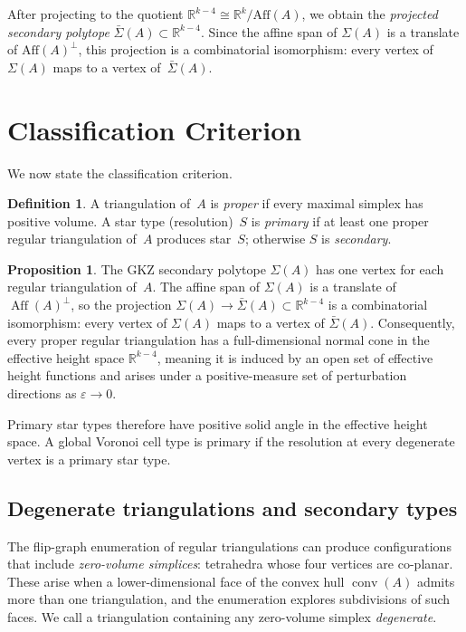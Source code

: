 \documentclass[11pt]{article}
\newcommand{\R}{\mathbb{R}}
\newcommand{\conv}{\operatorname{conv}}
\theoremstyle{definition}
\newtheorem{definition}{Definition}
\newtheorem{proposition}{Proposition}
\begin{document}
After projecting to the quotient $\R^{k-4} \cong \R^k / \text{Aff}(A)$,
we obtain the \emph{projected secondary polytope}
$\bar\Sigma(A) \subset \R^{k-4}$.  Since the affine span of $\Sigma(A)$
is a translate of $\text{Aff}(A)^\perp$, this projection is a
combinatorial isomorphism: every vertex of $\Sigma(A)$ maps to a vertex
of~$\bar\Sigma(A)$.


\section{Classification Criterion}

We now state the classification criterion.

\begin{definition}
A triangulation of~$A$ is \emph{proper} if every maximal simplex has
positive volume.  A star type (resolution)~$S$ is \emph{primary} if at
least one proper regular triangulation of~$A$ produces star~$S$;
otherwise $S$ is \emph{secondary}.
\end{definition}

\begin{proposition}
The GKZ secondary polytope $\Sigma(A)$ has one vertex for each regular
triangulation of~$A$.  The affine span of $\Sigma(A)$ is a translate of
$\operatorname{Aff}(A)^\perp$, so the projection
$\Sigma(A) \to \bar\Sigma(A) \subset \R^{k-4}$ is a combinatorial
isomorphism: every vertex of $\Sigma(A)$ maps to a vertex of
$\bar\Sigma(A)$.  Consequently, every proper regular triangulation has a
full-dimensional normal cone in the effective height space $\R^{k-4}$,
meaning it is induced by an open set of effective height functions and
arises under a positive-measure set of perturbation directions as
$\varepsilon \to 0$.
\end{proposition}

Primary star types therefore have positive solid angle in the effective
height space.  A global Voronoi cell type is primary if the resolution
at every degenerate vertex is a primary star type.

\subsection{Degenerate triangulations and secondary types}

The flip-graph enumeration of regular triangulations can produce
configurations that include \emph{zero-volume simplices}: tetrahedra
whose four vertices are co-planar.  These arise when a lower-dimensional
face of the convex hull $\conv(A)$ admits more than one triangulation,
and the enumeration explores subdivisions of such faces.  We call a
triangulation containing any zero-volume simplex \emph{degenerate}.
\end{document}
